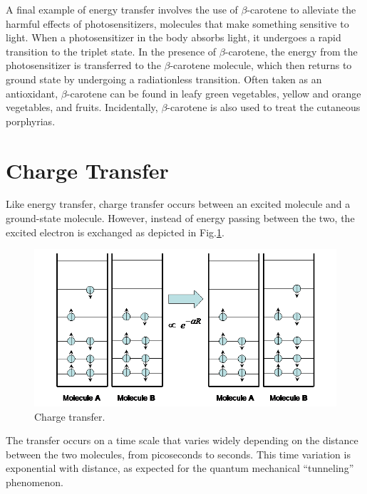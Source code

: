 A final example of energy transfer involves the use of $\beta$-carotene to alleviate the harmful effects of photosensitizers, molecules that make something sensitive to light.  When a photosensitizer in the body absorbs light, it undergoes a rapid transition to the triplet state.  In the presence of $\beta$-carotene, the energy from the photosensitizer is transferred to the $\beta$-carotene molecule, which then returns to ground state by undergoing a radiationless transition.  Often taken as an antioxidant, $\beta$-carotene can be found in leafy green vegetables, yellow and orange vegetables, and fruits.  Incidentally, $\beta$-carotene is also used to treat the cutaneous porphyrias.


\section{Charge Transfer}
Like energy transfer, charge transfer occurs between an excited molecule and a ground-state molecule.  However, instead of energy passing between the two, the excited electron is exchanged as depicted in Fig.\ref{Fig7-10}.
\begin{figure}[h]
	\centering
	\includegraphics[width=4.5in]{./figures/Topic7/Fig7-10.png}
	\caption{Charge transfer.}
	\label{Fig7-10}
\end{figure}

The transfer occurs on a time scale that varies widely depending on the distance between the two molecules, from picoseconds to seconds.  This time variation is exponential with distance, as expected for the quantum mechanical “tunneling” phenomenon.

